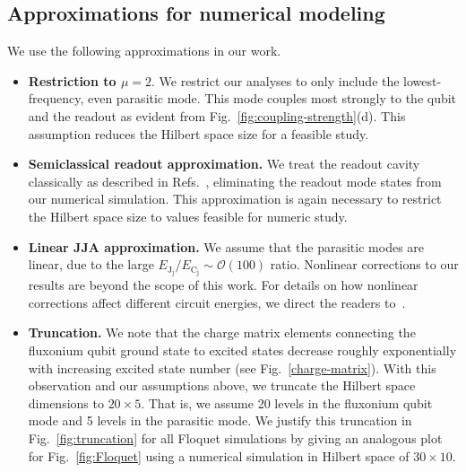 \documentclass[%
reprint,
superscriptaddress,
 amsmath,amssymb,
 aps,
 prx,
longbibliography,
floatfix,
]{revtex4-2}
\begin{document}
\subsection{Approximations for numerical modeling}\label{app:numerics}
We use the following approximations in our work.
\begin{itemize}
    \item \textbf{Restriction to $\mu=2$}. We restrict our analyses to only include the lowest-frequency, even parasitic mode. This mode couples most strongly to the qubit and the readout as evident from Fig.~\ref{fig:coupling-strength}(d). This assumption reduces the Hilbert space size for a feasible study. 

    \item \textbf{Semiclassical readout approximation.} We treat the readout cavity classically as described in Refs.~\cite{dumas2024unified,cohen2023reminiscence,khezri2023measurement}, eliminating the readout mode states from our numerical simulation. This approximation is again necessary to restrict the Hilbert space size to values feasible for numeric study.
    
    \item \textbf{Linear JJA approximation.} We assume that the parasitic modes are linear, due to the large $E_{\textrm{J}_\textrm{j}}/E_{\textrm{C}_\textrm{j}} \sim \mathcal{O}(100)$ ratio. Nonlinear corrections to our results are beyond the scope of this work. For details on how nonlinear corrections affect different circuit energies, we direct the readers to~\cite{viola2015collective}.
    
    \item \textbf{Truncation.} We note that the charge matrix elements connecting the fluxonium qubit ground state to excited states decrease roughly exponentially with increasing excited state number (see Fig.~\ref{charge-matrix}). With this observation and our assumptions above, we truncate the Hilbert space dimensions to $20\times 5$. That is, we assume 20 levels in the fluxonium qubit mode and 5 levels in the parasitic mode. We justify this truncation in Fig.~\ref{fig:truncation} for all Floquet simulations by giving an analogous plot for Fig.~\ref{fig:Floquet} using a numerical simulation in Hilbert space of $30\times 10$.
   \end{itemize}
\end{document}
